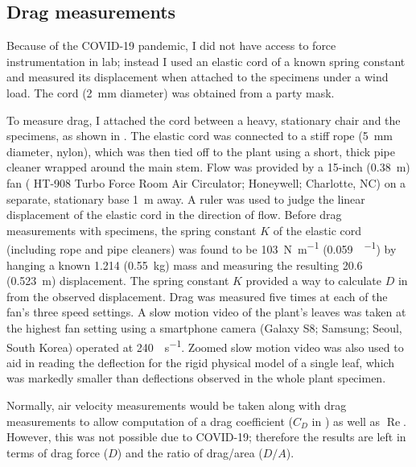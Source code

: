 \subsection{Drag measurements}
Because of the COVID-19 pandemic, I did not have access to force instrumentation in lab; instead I used an elastic cord of a known spring constant and measured its displacement when attached to the specimens under a wind load. The cord (\SI{2}{\milli\meter} diameter) was obtained from a party mask. 

To measure drag, I attached the cord between a heavy, stationary chair and the specimens, as shown in . The elastic cord was connected to a stiff rope (\SI{5}{\milli\meter} diameter, nylon), which was then tied off to the plant using a short, thick pipe cleaner wrapped around the main stem. Flow was provided by a 15-inch (\SI{0.38}{\meter}) fan ( HT-908 Turbo Force Room Air Circulator; Honeywell; Charlotte, NC) on a separate, stationary base \SI{1}{\meter} away. A ruler was used to judge the linear displacement of the elastic cord in the direction of flow.  Before drag measurements with specimens, the spring constant $K$ of the elastic cord (including rope and pipe cleaners) was found to be \SI{103}{\newton\per\meter} (\SI{0.059}{\poundforce\per\inch}) by hanging a known \SI{1.214}{\pound} (\SI{0.55}{\kilo\gram}) mass and measuring the resulting \SI{20.6}{\inch} (\SI{0.523}{\meter}) displacement. The spring constant $K$ provided a way to calculate $D$ in  from the observed displacement. Drag was measured five times at each of the fan's three speed settings. A slow motion video of the plant's leaves was taken at the highest fan setting using a smartphone camera (Galaxy S8; Samsung; Seoul, South Korea) operated at \SI{240}{\frame\per\second}. Zoomed slow motion video was also used to aid in reading the deflection for the rigid physical model of a single leaf, which was markedly smaller than deflections observed in the whole plant specimen. 

Normally, air velocity measurements would be taken along with drag measurements to allow computation of a drag coefficient ($C_D$ in ) as well as $\operatorname{Re}$. However, this was not possible due to COVID-19; therefore the results are left in terms of drag force ($D$) and the ratio of drag/area ($D/A$). 

